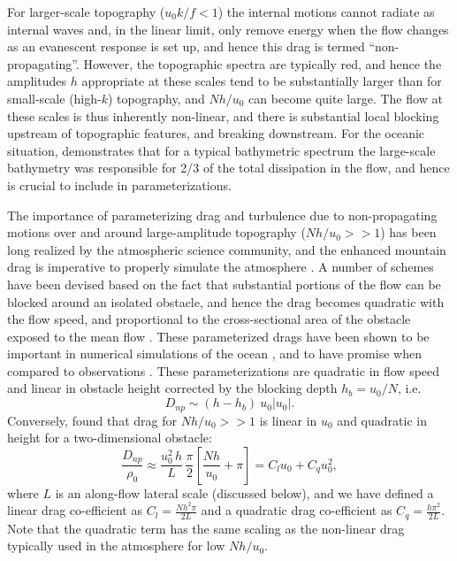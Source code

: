 \documentclass[twocol]{ametsocV5}
\begin{document}
For larger-scale topography ($u_0k/f<1$) the internal motions cannot radiate as internal waves and, in the linear limit, only remove energy when the flow changes as an evanescent response is set up, and hence this drag is termed ``non-propagating''.  However, the topographic spectra are typically red, and hence the amplitudes $h$ appropriate at these scales tend to be substantially larger than for small-scale (high-$k$) topography, and $Nh/u_0$ can become quite large.  The flow at these scales is thus inherently non-linear, and there is substantial local blocking upstream of topographic features, and breaking downstream. For the oceanic situation, \citet{klymak18} demonstrates that for a typical bathymetric spectrum  \citep[i.e.\ the ones used by][]{nikurashinferrari14} the large-scale bathymetry was responsible for 2/3 of the total dissipation in the flow, and hence is crucial to include in parameterizations.

The importance of parameterizing drag and turbulence due to non-propagating motions over and around large-amplitude topography ($Nh/u_0 >> 1$) has been long realized by the atmospheric science community, and the enhanced mountain drag is imperative to properly simulate the atmosphere \citep[i.e.][]{bacmeisterpierrhumbert88,LottMiller97}.  A number of schemes have been devised based on the fact that substantial portions of the flow can be blocked around an isolated obstacle, and hence the drag becomes quadratic with the flow speed, and proportional to the cross-sectional area of the obstacle exposed to the mean flow \citep[i.e.][]{ScinoccaMcFarlane00, Garner05}.  These parameterized drags have been shown to be important in numerical simulations of the ocean \citep{trossmanetal13,trossmanetal2016}, and to have promise when compared to observations \citep{TrossmanEtAl15}.  These parameterizations are quadratic in flow speed and linear in obstacle height corrected by the blocking depth $h_b = u_0/N$, i.e.
\begin{equation}
    D_{np} \sim (h-h_b)\ u_0 \left|u_0\right|.
\end{equation}
Conversely, \citep{klymaketal10a} found that drag for $Nh/u_0 >> 1$ is linear in $u_0$ and quadratic in height for a two-dimensional obstacle:
\begin{equation}
    \frac{D_{np}}{\rho_0} \approx \frac{u_0^2\, h}{L}\, \frac{\pi}{2}\left[\frac{N h}{u_0}+ \pi\right] = C_l u_0 + C_q u_0^2,
    \label{eq:FormDragParam}
\end{equation}
where $L$ is an along-flow lateral scale (discussed below), and we have defined a linear drag co-efficient as $C_l = \frac{N h^2\pi}{2L}$ and a quadratic drag co-efficient as $C_q = \frac{h\pi^2}{2L}$.  Note that the quadratic  term has the same scaling as the non-linear drag typically used in the atmosphere for low $Nh/u_0$.
\end{document}

